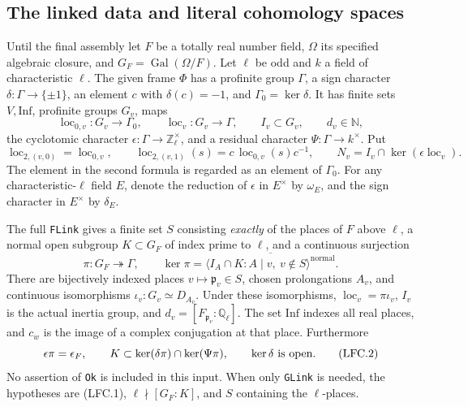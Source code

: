 \documentclass[11pt,a4paper]{article}
\numberwithin{equation}{section}
\theoremstyle{remark}\newtheorem{remark}[theorem]{Remark}
\begin{document}
\subsection{The linked data and literal cohomology spaces}

Until the final assembly let \(F\) be a totally real number field,
\(\Omega\) its specified algebraic closure, and
\(G_F=\operatorname{Gal}(\Omega/F)\).  Let \(\ell\) be odd and
\(k\) a field of characteristic \(\ell\).  The given frame
\(\Phi\) has a profinite group \(\Gamma\), a sign character
\(\delta:\Gamma\to\{\pm1\}\), an element \(c\) with
\(\delta(c)=-1\), and \(\Gamma_0=\ker\delta\).
It has finite sets \(V,\mathrm{Inf}\), profinite groups \(G_v\),
maps
\[
 \operatorname{loc}_{0,v}:G_v\longrightarrow\Gamma_0,\qquad
 \operatorname{loc}_v:G_v\longrightarrow\Gamma,
 \qquad I_v\subset G_v,\qquad d_v\in\mathbb N,
\]
the cyclotomic character \(\epsilon:\Gamma\to\mathbb Z_\ell^\times\),
and a residual character \(\Psi:\Gamma\to k^\times\).
Put
\[
 \operatorname{loc}_{2,(v,0)}=\operatorname{loc}_{0,v},\qquad
 \operatorname{loc}_{2,(v,1)}(s)
       =c\,\operatorname{loc}_{0,v}(s)c^{-1},\qquad
 N_v=I_v\cap\ker(\epsilon\operatorname{loc}_v).
\]
The element in the second formula is regarded as an element of
\(\Gamma_0\).  For any characteristic-\(\ell\) field \(E\), denote
the reduction of \(\epsilon\) in \(E^\times\) by \(\omega_E\),
and the sign character in \(E^\times\) by \(\delta_E\).

The full \texttt{FLink} gives a finite set \(S\) consisting
\emph{exactly} of the places of \(F\) above \(\ell\), a normal open
subgroup \(K\subset G_F\) of index prime to \(\ell\), and a
continuous surjection
\[
 \pi:G_F\twoheadrightarrow\Gamma,\qquad
 \ker\pi=
 \overline{\langle I_A\cap K:
                  A\mid v,\ v\notin S\rangle^{\mathrm{normal}}}.
                                                        \tag{LFC.1}
\]
There are bijectively indexed places \(v\mapsto\mathfrak p_v\in S\),
chosen prolongations \(A_v\), and continuous isomorphisms
\(\iota_v:G_v\simeq D_{A_v}\).  Under these isomorphisms,
\(\operatorname{loc}_v=\pi\iota_v\), \(I_v\) is the actual inertia
group, and \(d_v=[F_{\mathfrak p_v}:\mathbb Q_\ell]\).
The set \(\mathrm{Inf}\) indexes all real places, and \(c_w\)
is the image of a complex conjugation at that place.
Furthermore
\[
 \epsilon\pi=\epsilon_F,\qquad
 K\subset\ker(\delta\pi)\cap\ker(\Psi\pi),\qquad
 \ker\delta\ \hbox{is open}.                              \tag{LFC.2}
\]
No assertion of \texttt{Ok} is included in this input.
When only \texttt{GLink} is needed, the hypotheses are (LFC.1),
\(\ell\nmid[G_F:K]\), and \(S\) containing the \(\ell\)-places.
\end{document}
